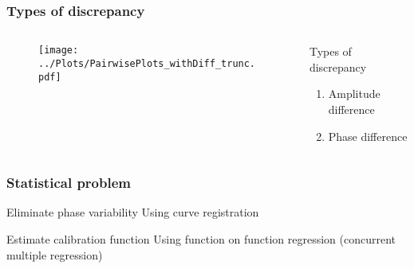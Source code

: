 \documentclass[10pt,dvipsnames,table]{beamer}
\begin{document}
\begin{frame}
\frametitle{Types of discrepancy}
\begin{columns}[t]
\begin{column}{0.6\textwidth}
\vspace{-0.3cm}
\begin{center}
\begin{figure}
\texttt{[image: ../Plots/PairwisePlots\_withDiff\_trunc.pdf]} 
\end{figure}
\end{center}
\end{column}
\pause

\begin{column}{0.4\textwidth}
\vspace{1.5cm}
\begin{block}{Types of discrepancy}
\begin{enumerate}
\item Amplitude difference
\vspace{1cm}
\item Phase difference
\end{enumerate}
\end{block}
\end{column}
\end{columns}
\end{frame}

\begin{frame}
\frametitle{Statistical problem}
\begin{block}{Eliminate phase variability}
Using curve registration
\end{block}
\vspace{1 cm}
\pause
\begin{block}{Estimate calibration function}
Using function on function regression (concurrent multiple regression)
\end{block}
\end{frame}
\end{document}
